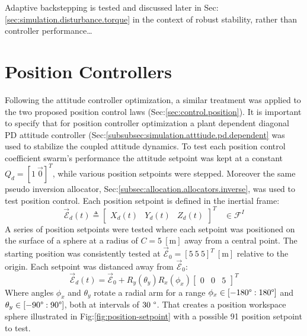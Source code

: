 \par
Adaptive backstepping is tested and discussed later in Sec:\ref{sec:simulation.disturbance.torque} in the context of robust stability, rather than controller performance\ldots 
\section{Position Controllers}
\label{sec:simulation.position}
Following the attitude controller optimization, a similar treatment was applied to the two proposed position control laws (Sec:\ref{sec:control.position}). It is important to specify that for position controller optimization a plant dependent diagonal PD attitude controller (Sec:\ref{subsubsec:simulation.atttiude.pd.dependent} was used to stabilize the coupled attitude dynamics. To test each position control coefficient swarm's performance the attitude setpoint was kept at a constant $Q_d=[1~\vec{0}]^T$, while various position setpoints were stepped. Moreover the same pseudo inversion allocator, Sec:\ref{subsec:allocation.allocators.inverse}, was used to test position control. Each position setpoint is defined in the inertial frame:
\begin{equation}
\vec{\mathcal{E}}_d(t)\triangleq\begin{bmatrix}
X_d(t)&
Y_d(t)&
Z_d(t)
\end{bmatrix}^T
~~~~\in\mathcal{F}^{I}
\end{equation}
A series of position setpoints were tested where each setpoint was positioned on the surface of a sphere at a radius of $C=5~[\text{m}]$ away from a central point. The starting position was consistently tested at $\vec{\mathcal{E}}_0=[5~5~5]^{T}~[\text{m}]$ relative to the origin. Each setpoint was distanced away from $\vec{\mathcal{E}}_0$:
\begin{equation}
\vec{\mathcal{E}}_d(t)=\vec{\mathcal{E}}_0+R_y(\theta_{y})R_x(\phi_{x})\begin{bmatrix}
0 & 0 & 5
\end{bmatrix}^T
\end{equation}
Where angles $\phi_x$ and $\theta_y$ rotate a radial arm for a range $\phi_x\in[-180\text{\textdegree}:180\text{\textdegree}]$ and $\theta_y\in[-90\text{\textdegree}:90\text{\textdegree}]$, both at intervals of $30~\text{\textdegree}$. That creates a position workspace sphere illustrated in Fig:\ref{fig:position-setpoint} with a possible 91 position setpoint to test.
